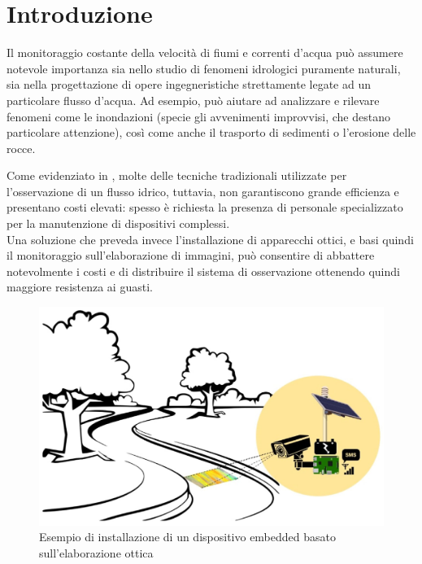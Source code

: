 \chapter{Introduzione}

Il monitoraggio costante della velocità di fiumi e correnti d'acqua può assumere notevole importanza sia nello studio di 
fenomeni idrologici puramente naturali, sia nella progettazione di opere ingegneristiche strettamente legate ad un 
particolare flusso d'acqua. Ad esempio, può aiutare ad analizzare e rilevare fenomeni come le inondazioni (specie gli 
avvenimenti improvvisi, che destano particolare attenzione), così come anche il trasporto di sedimenti o 
l'erosione delle rocce.

Come evidenziato in \cite{rs10122010}, molte delle tecniche tradizionali utilizzate per l'osservazione di un flusso idrico, tuttavia, non garantiscono 
grande efficienza e presentano costi elevati: spesso è richiesta la presenza di personale specializzato per la 
manutenzione di dispositivi complessi.\\ %
Una soluzione che preveda invece l'installazione di apparecchi ottici, e basi quindi il monitoraggio sull'elaborazione di
immagini, può consentire di abbattere notevolmente i costi e di distribuire il sistema di osservazione ottenendo quindi 
maggiore resistenza ai guasti.%

\begin{figure}[h!]
    \begin{center}
        \includegraphics[scale=0.2]{img/otv_real_use.jpg}
        \caption{Esempio di installazione di un dispositivo embedded basato sull'elaborazione ottica}
    \end{center}
\end{figure}

